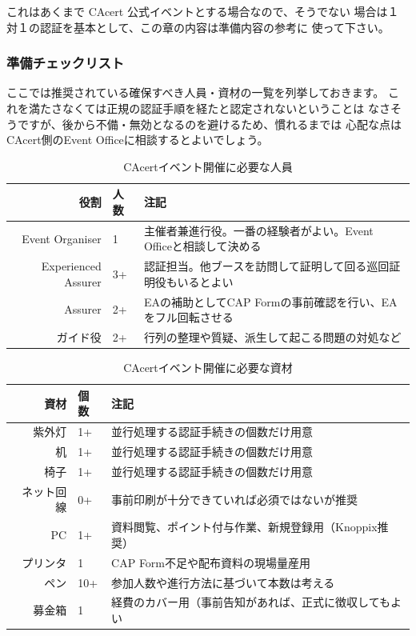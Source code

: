 \documentclass[mingoth,a4paper]{jsarticle}
\begin{document}
これはあくまで CAcert 公式イベントとする場合なので、そうでない
場合は１対１の認証を基本として、この章の内容は準備内容の参考に
使って下さい。

\subsubsection{準備チェックリスト}
ここでは推奨されている確保すべき人員・資材の一覧を列挙しておきます。
これを満たさなくては正規の認証手順を経たと認定されないということは
なさそうですが、後から不備・無効となるのを避けるため、慣れるまでは
心配な点はCAcert側のEvent Officeに相談するとよいでしょう。

\begin{table}[h]
\begin{center}
\begin{tabular}{|r|l|p{25em}|}
\hline
役割 & 人数 & 注記 \\ \hline
Event Organiser & 1
  & 主催者兼進行役。一番の経験者がよい。Event Officeと相談して決める \\ \hline
Experienced Assurer & 3+
  & 認証担当。他ブースを訪問して証明して回る巡回証明役もいるとよい \\ \hline
Assurer & 2+
  & EAの補助としてCAP Formの事前確認を行い、EAをフル回転させる \\ \hline
ガイド役 & 2+
  & 行列の整理や質疑、派生して起こる問題の対処など \\ \hline
\end{tabular}
\end{center}
\caption{CAcertイベント開催に必要な人員}
\end{table}

\begin{table}[h]
\begin{center}
\begin{tabular}{|r|l|p{25em}|}
\hline
資材 & 個数 & 注記 \\ \hline
紫外灯     & 1+  & 並行処理する認証手続きの個数だけ用意 \\ \hline
机         & 1+  & 並行処理する認証手続きの個数だけ用意 \\ \hline
椅子       & 1+  & 並行処理する認証手続きの個数だけ用意 \\ \hline
ネット回線 & 0+  & 事前印刷が十分できていれば必須ではないが推奨 \\ \hline
PC         & 1+  & 資料閲覧、ポイント付与作業、新規登録用（Knoppix推奨） \\ \hline
プリンタ   & 1   & CAP Form不足や配布資料の現場量産用 \\ \hline
ペン       & 10+ & 参加人数や進行方法に基づいて本数は考える \\ \hline
募金箱     & 1   & 経費のカバー用（事前告知があれば、正式に徴収してもよい \\ \hline
\end{tabular}
\end{center}
\caption{CAcertイベント開催に必要な資材}
\end{table}
\end{document}
